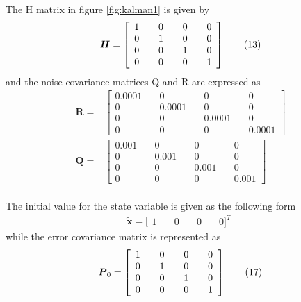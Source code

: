 \documentclass{l4proj}
\begin{document}
\\
The H matrix in figure \ref{fig:kalman1} is given by
\begin{equation*} \boldsymbol {H} = \left [{ {\begin{array}{*{20}c} 1 &\quad 0 &\quad 0 &\quad 0 \\ 0 &\quad 1 &\quad 0 &\quad 0 \\ 0 &\quad 0 &\quad 1 &\quad 0 \\ 0 &\quad 0 &\quad 0 &\quad 1 \\ \end{array}} }\right]\tag{13}\end{equation*} and the noise covariance matrices Q and R are expressed as
\begin{align*} \boldsymbol {R}=&\left [{ {\begin{array}{*{20}{c}} {0.0001}&\quad 0&\quad 0&\quad 0\\ 0&\quad {0.0001}&\quad 0&\quad 0\\ 0&\quad 0&\quad {0.0001}&\quad 0\\ 0&\quad 0&\quad 0&\quad {0.0001} \end{array}} }\right] \tag{14}\\ \boldsymbol {Q}=&\left [{ {\begin{array}{*{20}{c}} {0.001}&\quad 0&\quad 0&\quad 0\\ 0&\quad {0.001}&\quad 0&\quad 0\\ 0&\quad 0&\quad {0.001}&\quad 0\\ 0&\quad 0&\quad 0&\quad {0.001} \end{array}} }\right]\tag{15}\end{align*}\\

The initial value for the state variable is given as the following form
\begin{equation*} \tilde {\boldsymbol {x}}= \big[\begin{array}{*{20}{c}} 1&\quad 0&\quad 0&\quad {0}\big]^{T} \end{array}\tag{16}\end{equation*} while the error covariance matrix is represented as
\begin{equation*} \boldsymbol {P}_{0} = \left [{ {\begin{array}{*{20}c} 1 &\quad 0 &\quad 0 &\quad 0 \\ 0 &\quad 1 &\quad 0 &\quad 0 \\ 0 &\quad 0 &\quad 1 &\quad 0 \\ 0 &\quad 0 &\quad 0 &\quad 1 \\ \end{array}} }\right]\tag{17}\end{equation*}\cite{kalmanfilter}\\
\end{document}
